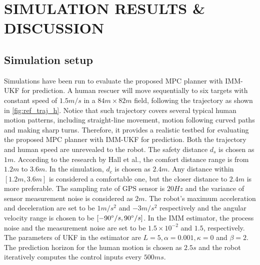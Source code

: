 \documentclass[letterpaper, 10 pt, conference]{ieeeconf}
\begin{document}
	
	\section{SIMULATION RESULTS \& DISCUSSION}\label{sec:results}
	\subsection{Simulation setup}
	Simulations have been run to evaluate the proposed MPC planner with IMM-UKF for prediction.
	A human rescuer will move sequentially to six targets with constant speed of $1.5m/s$ in a $84 m\times 82 m$ field, following the trajectory as shown in \cref{fig:ref_traj_h}.
	Notice that such trajectory covers several typical human motion patterns, including straight-line movement, motion following curved paths and making sharp turns.
	Therefore, it provides a realistic testbed for evaluating the proposed MPC planner with IMM-UKF for prediction.
	Both the trajectory and human speed are unrevealed to the robot.
	The safety distance $d_s$ is chosen as $1m$.
	According to the research by Hall et al.\cite{hall1968proxemics}, the comfort distance range is from $1.2m$ to $3.6m$.
	In the simulation, $d_c$ is chosen as $2.4m$.
	Any distance within $[1.2m,3.6m]$ is considered a comfortable one, but the closer distance to $2.4m$ is more preferable.
	The sampling rate of GPS sensor is $20Hz$ and the variance of sensor measurement noise is considered as $2m$. 
	The robot's maximum acceleration and deceleration are set to be $1 m/s^2$ and $-3 m/s^2$ respectively and the angular velocity range is chosen to be $[-90\degree/s,90\degree/s]$.
	In the IMM estimator, the process noise and the measurement noise are set to be $1.5\times 10^{-2}$ and $1.5$, respectively. The parameters of UKF in the estimator are $L=5,\alpha=0.001, \kappa=0$ and $\beta=2$.
	The prediction horizon for the human motion is chosen as $2.5s$ and the robot iteratively computes the control inputs every $500ms$.
	
\end{document}
